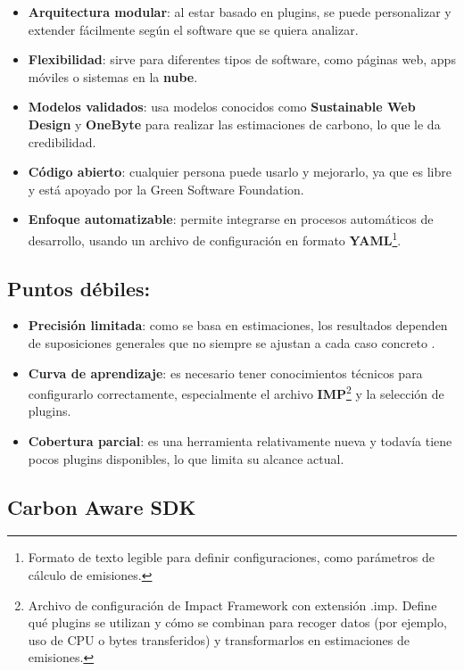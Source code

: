 \documentclass[12pt,a4paper]{report}
\begin{document}
\begin{itemize}
  \item \textbf{Arquitectura modular}: al estar basado en plugins, se puede personalizar y extender fácilmente según el software que se quiera analizar.
  \item \textbf{Flexibilidad}: sirve para diferentes tipos de software, como páginas web, apps móviles o sistemas en la \textbf{nube}.
  \item \textbf{Modelos validados}: usa modelos conocidos como \textbf{Sustainable Web Design} y \textbf{OneByte} para realizar las estimaciones de carbono, lo que le da credibilidad.
  \item \textbf{Código abierto}: cualquier persona puede usarlo y mejorarlo, ya que es libre y está apoyado por la Green Software Foundation.
  \item \textbf{Enfoque automatizable}: permite integrarse en procesos automáticos de desarrollo, usando un archivo de configuración en formato \textbf{YAML}\footnote{Formato de texto legible para definir configuraciones, como parámetros de cálculo de emisiones.}.
\end{itemize}

\subsection*{Puntos débiles:}

\begin{itemize}
  \item \textbf{Precisión limitada}: como se basa en estimaciones, los resultados dependen de suposiciones generales que no siempre se ajustan a cada caso concreto \cite{ref10}.
  \item \textbf{Curva de aprendizaje}: es necesario tener conocimientos técnicos para configurarlo correctamente, especialmente el archivo \textbf{IMP}\footnote{Archivo de configuración de Impact Framework con extensión .imp. Define qué plugins se utilizan y cómo se combinan para recoger datos (por ejemplo, uso de CPU o bytes transferidos) y transformarlos en estimaciones de emisiones.} y la selección de plugins.
  \item \textbf{Cobertura parcial}: es una herramienta relativamente nueva y todavía tiene pocos plugins disponibles, lo que limita su alcance actual.
\end{itemize}

\subsection*{Carbon Aware SDK}
\end{document}
